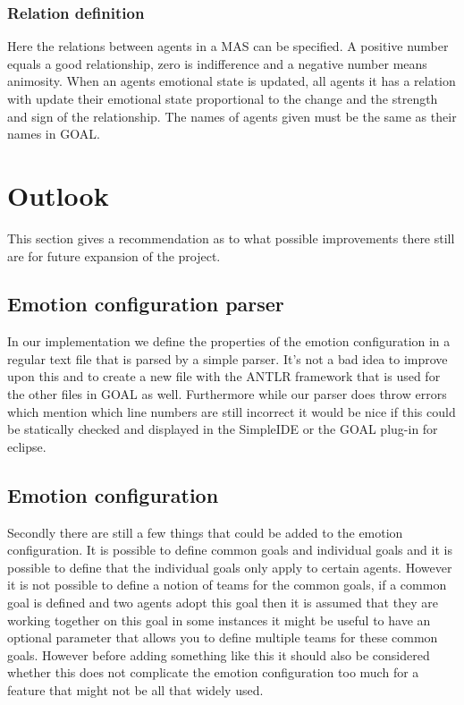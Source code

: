 \documentclass[11pt]{article}
\begin{document}
\subsubsection*{Relation definition}
Here the relations between agents in a MAS can be specified. A positive number equals a good relationship, zero is indifference and a negative number means animosity. When an agents emotional state is updated, all agents it has a relation with update their emotional state proportional to the change and the strength and sign of the relationship. The names of agents given must be the same as their names in GOAL.


\section{Outlook}
This section gives a recommendation as to what possible improvements there still are for future expansion of the project.

\subsection{Emotion configuration parser}
In our implementation we define the properties of the emotion configuration in a regular text file that is parsed by a simple parser. It's not a bad idea to improve upon this and to create a new file with the ANTLR framework that is used for the other files in GOAL as well. Furthermore while our parser does throw errors which mention which line numbers are still incorrect it would be nice if this could be statically checked and displayed in the SimpleIDE or the GOAL plug-in for eclipse.

\subsection{Emotion configuration}
Secondly there are still a few things that could be added to the emotion configuration. It is possible to define common goals and individual goals and it is possible to define that the individual goals only apply to certain agents. However it is not possible to define a notion of teams for the common goals, if a common goal is defined and two agents adopt this goal then it is assumed that they are working together on this goal in some instances it might be useful to have an optional parameter that allows you to define multiple teams for these common goals. However before adding something like this it should also be considered whether this does not complicate the emotion configuration too much for a feature that might not be all that widely used.
\end{document}

